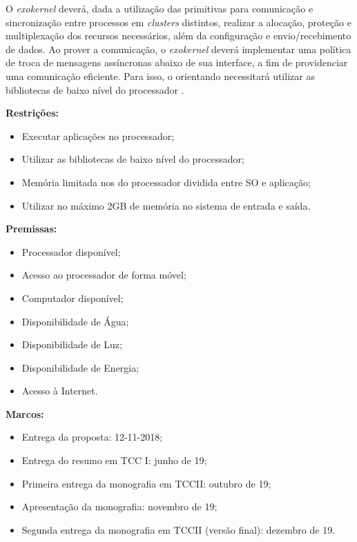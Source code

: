 \documentclass[
	12pt,				%
	openright,			%
	twoside,			%
	a4paper,			%
	english,			%
	brazil,				%
	]{abntex2}
\begin{document}
    O \textit{exokernel} deverá, dada a utilização das primitivas \ipc para
    comunicação e sincronização entre processos em \textit{clusters} distintos,
    realizar a alocação, proteção e multiplexação dos recursos necessários, 
    além da configuração e envio/recebimento de dados.
    Ao prover a comunicação, o \textit{exokernel} deverá implementar uma 
    política de troca de mensagens assíncronas abaixo de sua interface, 
    a fim de providenciar uma comunicação eficiente.
    Para isso, o orientando necessitará utilizar as bibliotecas de baixo 
    nível do processador \mppa. 
    
    \begin{flushleft}
    \textbf{Restrições:}
    \begin{itemize}
        \item Executar aplicações no processador;
        \item Utilizar as bibliotecas de baixo nível do processador;
        \item Memória limitada nos \cpclusters do processador dividida entre SO e aplicação;
        \item Utilizar no máximo 2GB de memória no sistema de entrada e saída.
    \end{itemize}
    
    \textbf{Premissas:}
    \begin{itemize}
        \item Processador disponível; 
        \item Acesso ao processador de forma móvel; 
        \item Computador disponível; 
        \item Disponibilidade de Água; 
        \item Disponibilidade de Luz; 
        \item Disponibilidade de Energia; 
        \item Acesso à Internet.
    \end{itemize}
    
    \textbf{Marcos:}
    \begin{itemize}
        \item Entrega da proposta: 12-11-2018;
        \item Entrega do resumo em TCC I: junho de 19; 
        \item Primeira entrega da monografia em TCCII: outubro de 19; 
        \item Apresentação da monografia: novembro de 19;
        \item Segunda entrega da monografia em TCCII (versão final): dezembro de 19.
    \end{itemize}
    

\end{flushleft}
\end{document}

